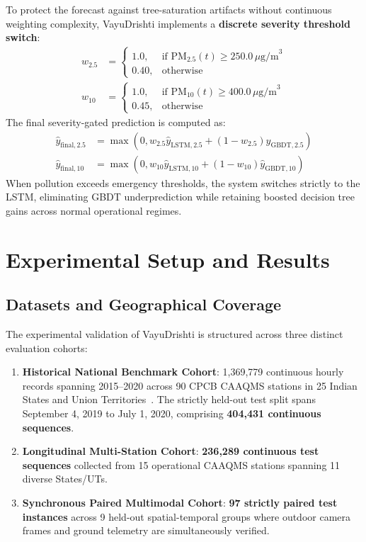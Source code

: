 \documentclass[conference]{IEEEtran}
\begin{document}
To protect the forecast against tree-saturation artifacts without continuous weighting complexity, VayuDrishti implements a \textbf{discrete severity threshold switch}:
\begin{align}
w_{2.5} &= \begin{cases} 1.0, & \text{if } \text{PM}_{2.5}(t) \ge 250.0\,\mu\text{g/m}^3 \\ 0.40, & \text{otherwise} \end{cases} \\
w_{10} &= \begin{cases} 1.0, & \text{if } \text{PM}_{10}(t) \ge 400.0\,\mu\text{g/m}^3 \\ 0.45, & \text{otherwise} \end{cases}
\end{align}
The final severity-gated prediction is computed as:
\begin{align}
\hat{y}_{\text{final}, 2.5} &= \max\left(0, w_{2.5} \hat{y}_{\text{LSTM}, 2.5} + (1 - w_{2.5}) \hat{y}_{\text{GBDT}, 2.5}\right) \\
\hat{y}_{\text{final}, 10} &= \max\left(0, w_{10} \hat{y}_{\text{LSTM}, 10} + (1 - w_{10}) \hat{y}_{\text{GBDT}, 10}\right)
\end{align}
When pollution exceeds emergency thresholds, the system switches strictly to the LSTM, eliminating GBDT underprediction while retaining boosted decision tree gains across normal operational regimes.

\section{Experimental Setup and Results}
\label{sec:experiments}

\subsection{Datasets and Geographical Coverage}
The experimental validation of VayuDrishti is structured across three distinct evaluation cohorts:
\begin{enumerate}
    \item \textbf{Historical National Benchmark Cohort}: 1,369,779 continuous hourly records spanning 2015--2020 across 90 CPCB CAAQMS stations in 25 Indian States and Union Territories~\cite{rao2020cpcbdata}. The strictly held-out test split spans September 4, 2019 to July 1, 2020, comprising \textbf{404,431 continuous sequences}.
    \item \textbf{Longitudinal Multi-Station Cohort}: \textbf{236,289 continuous test sequences} collected from 15 operational CAAQMS stations spanning 11 diverse States/UTs.
    \item \textbf{Synchronous Paired Multimodal Cohort}: \textbf{97 strictly paired test instances} across 9 held-out spatial-temporal groups where outdoor camera frames and ground telemetry are simultaneously verified.
\end{enumerate}
\end{document}
